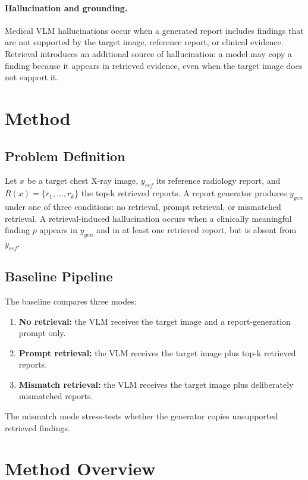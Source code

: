 \documentclass[11pt]{article}
\begin{document}
\paragraph{Hallucination and grounding.}
Medical VLM hallucinations occur when a generated report includes findings that are not supported by the target image, reference report, or clinical evidence. Retrieval introduces an additional source of hallucination: a model may copy a finding because it appears in retrieved evidence, even when the target image does not support it.

\section{Method}

\subsection{Problem Definition}

Let $x$ be a target chest X-ray image, $y_{ref}$ its reference radiology report, and $R(x)=\{r_1,\ldots,r_k\}$ the top-k retrieved reports. A report generator produces $y_{gen}$ under one of three conditions: no retrieval, prompt retrieval, or mismatched retrieval. A retrieval-induced hallucination occurs when a clinically meaningful finding $p$ appears in $y_{gen}$ and in at least one retrieved report, but is absent from $y_{ref}$.

\subsection{Baseline Pipeline}

The baseline compares three modes:

\begin{enumerate}
    \item \textbf{No retrieval:} the VLM receives the target image and a report-generation prompt only.
    \item \textbf{Prompt retrieval:} the VLM receives the target image plus top-k retrieved reports.
    \item \textbf{Mismatch retrieval:} the VLM receives the target image plus deliberately mismatched reports.
\end{enumerate}

The mismatch mode stress-tests whether the generator copies unsupported retrieved findings.

\section{Method Overview}
\end{document}
